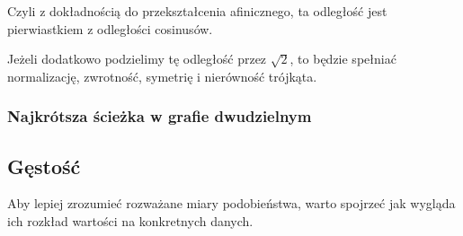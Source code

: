 \documentclass{article}
\begin{document}
Czyli z dokładnością do przekształcenia afinicznego, ta odległość jest
pierwiastkiem z odległości cosinusów.

Jeżeli dodatkowo podzielimy tę odległość przez $\sqrt 2$, to będzie spełniać
normalizację, zwrotność, symetrię i nierówność trójkąta.

\subsubsection{Najkrótsza ścieżka w grafie dwudzielnym}

\subsection{Gęstość}

Aby lepiej zrozumieć rozważane miary podobieństwa, warto spojrzeć jak wygląda
ich rozkład wartości na konkretnych danych.
\end{document}
